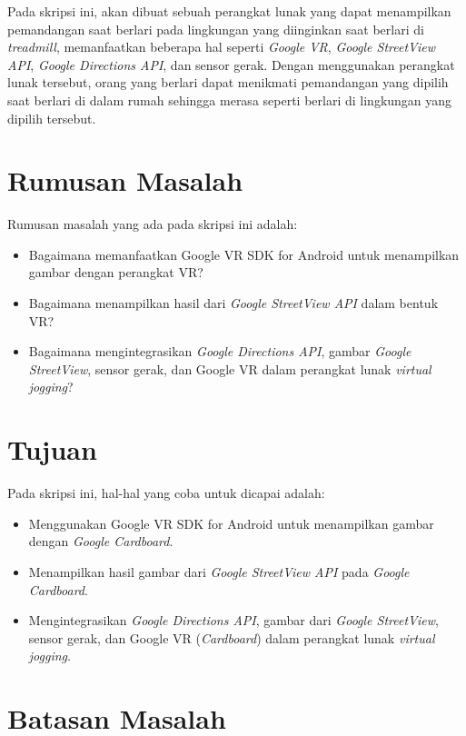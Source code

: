 Pada skripsi ini, akan dibuat sebuah perangkat lunak yang dapat menampilkan pemandangan saat berlari pada lingkungan yang diinginkan saat berlari di {\it treadmill}, memanfaatkan beberapa hal seperti \textit{Google VR}, \textit{Google StreetView API}, \textit{Google Directions API}, dan sensor gerak. Dengan menggunakan perangkat lunak tersebut, orang yang berlari dapat menikmati pemandangan yang dipilih saat berlari di dalam rumah sehingga merasa seperti berlari di lingkungan yang dipilih tersebut.
  
\section{Rumusan Masalah}
\label{sec:rumusan}
Rumusan masalah yang ada pada skripsi ini adalah:
\begin{itemize}
	\item Bagaimana memanfaatkan Google VR SDK for Android untuk menampilkan gambar dengan perangkat VR?
	\item Bagaimana menampilkan hasil dari \textit{Google StreetView API} dalam bentuk VR?
	
	\item Bagaimana mengintegrasikan \textit{Google Directions API}, gambar \textit{Google StreetView},  sensor gerak, dan Google VR dalam perangkat lunak \textit{virtual jogging}?
\end{itemize}

\section{Tujuan}
\label{sec:tujuan}
Pada skripsi ini, hal-hal yang coba untuk dicapai adalah:
\begin{itemize}
	\item Menggunakan Google VR SDK for Android untuk menampilkan gambar dengan {\it Google Cardboard}.
	\item Menampilkan hasil gambar dari \textit{Google StreetView API} pada {\it Google Cardboard}.
	\item Mengintegrasikan \textit{Google Directions API}, gambar dari \textit{Google StreetView}, sensor gerak, dan Google VR (\textit{Cardboard}) dalam perangkat lunak {\it virtual jogging}.
\end{itemize}

\section{Batasan Masalah}
\label{sec:batasan}

